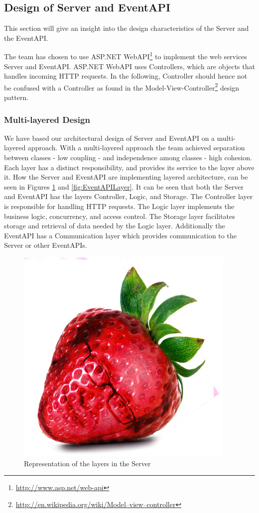 \subsection{Design of Server and EventAPI}
This section will give an insight into the design characteristics of the Server and the EventAPI.

The team has chosen to use ASP.NET WebAPI\footnote{\url{http://www.asp.net/web-api}} to implement the web services Server and EventAPI. ASP.NET WebAPI uses Controllers, which are objects that handles incoming HTTP requests. In the following, Controller should hence not be confused with a Controller as found in the Model-View-Controller\footnote{\url{http://en.wikipedia.org/wiki/Model–view–controller}} design pattern. 

\subsubsection{Multi-layered Design}
We have based our architectural design of Server and EventAPI on a multi-layered approach. With a multi-layered approach the team achieved separation between classes - low coupling - and independence among classes - high cohesion. Each layer has a distinct responsibility, and provides its service to the layer above it. How the Server and EventAPI are implementing layered architecture, can be seen in Figures \ref{fig:ServerLayer} and \ref{fig:EventAPILayer}. It can be seen that both the Server and EventAPI has the layers Controller, Logic, and Storage. The Controller layer is responsible for handling HTTP requests. The Logic layer implements the business logic, concurrency, and access control. The Storage layer facilitates storage and retrieval of data needed by the Logic layer. Additionally the EventAPI has a Communication layer which provides communication to the Server or other EventAPIs.

\begin{figure}[h!]
\centering
\includegraphics[width=0.3\linewidth]{figures/strawberry}
\caption{\label{fig:ServerLayer}  Representation of the layers in the Server}
\end{figure}


